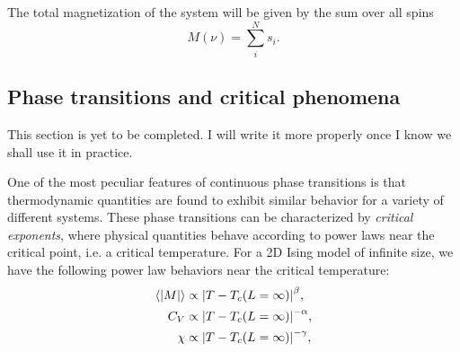 The total magnetization of the system will be given by the sum over all spins 
\begin{equation}\label{eq:total_magnetization}
    M(\nu) = \sum_{i}^N s_i.
\end{equation}

\subsection{Phase transitions and critical phenomena}\label{subsec_theory:PT_critical_phenomena}
\alert{This section is yet to be completed. I will write it more properly once I know we shall use it in practice.}

One of the most peculiar features of continuous phase transitions is that thermodynamic quantities are found to exhibit similar behavior for a variety of different systems. These phase transitions can be characterized by \textit{critical exponents}, where physical quantities behave according to power laws near the critical point, i.e. a critical temperature.  For a 2D Ising model of infinite size, we have the following power law behaviors near the critical temperature: 
\begin{align}
    \expval{\abs{M}} & \propto \abs{T - T_c(L=\infty)}^\beta, \label{eq:crit_expo_mag} \\
    C_V & \propto \abs{T - T_c(L=\infty)}^{-\alpha}, \label{eq:crit_expo_heatcap} \\ 
    \chi & \propto \abs{T - T_c(L=\infty)}^{-\gamma}, \label{eq:crit_expo_mag_susc}
\end{align}


